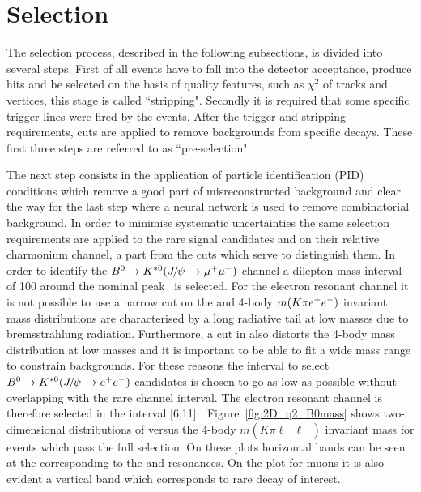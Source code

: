 \chapter{Selection}
\label{sec:RKst_selection}

The selection process, described in the following subsections,
is divided into several steps. 
First of all events have to fall into the detector acceptance, produce hits and be selected
on the basis of quality features, such as $\chi^2$ of tracks and vertices, this stage is
called ``stripping". Secondly it is required that some specific trigger lines were fired by the events.
After the trigger and stripping requirements, cuts are applied to remove backgrounds
from specific decays. These first three steps are referred to as ``pre-selection". 

The next step consists in the application of particle identification (PID) conditions which remove a good
part of misreconstructed background and clear the way for the last step where a neural network is used
to remove combinatorial background.
In order to minimise systematic uncertainties the same selection requirements are applied to the rare signal
candidates and on their relative charmonium channel, a part from the \qsq cuts which serve to 
distinguish them. In order to identify the $\Bz \to\Kstarz(\jpsi\to \mumu)$ channel a dilepton mass
interval of 100 \mevcc around the nominal \jpsi peak~\cite{PDG2014} is selected.
For the electron resonant channel it is not possible
to use a narrow cut on the \qsq and 4-body $m(K\pi\epem)$ invariant mass distributions are characterised
by a long radiative tail at low masses due to bremsstrahlung radiation. Furthermore, a cut in \qsq also
distorts the 4-body mass distribution at low masses and it is important to be able to fit a 
wide mass range to constrain backgrounds. For these reasons the interval to select
$\Bz \to\Kstarz(\jpsi\to \epem)$ candidates is chosen to go as low as possible without overlapping with
the rare channel interval. The electron resonant channel is therefore selected in the interval
[6,11] \gevgevcccc. Figure~\ref{fig:2D_q2_B0mass} shows two-dimensional distributions
of \qsq versus the 4-body $m(K\pi\ell^+\ell^-)$ invariant mass for events which pass the full selection.
On these plots horizontal bands can be seen at the \qsq corresponding to the \jpsi and \psitwos resonances.
On the plot for muons it is also evident a vertical band which corresponds to rare decay of interest.

